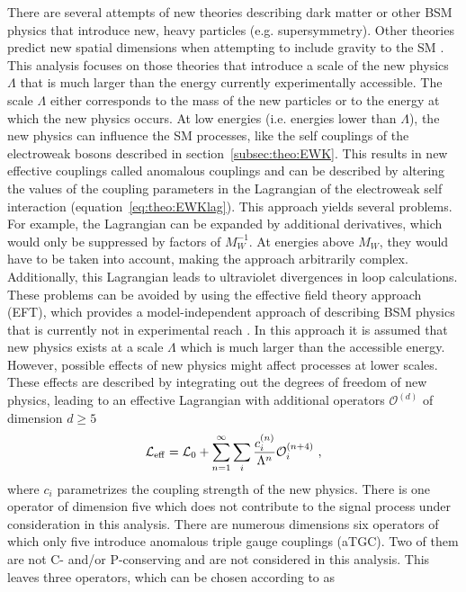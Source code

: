 \noindent There are several attempts of new theories describing dark matter or other BSM physics that introduce new, heavy particles (e.g. supersymmetry). Other theories predict new spatial dimensions when attempting to include gravity to the SM \cite{xdimensions}. This analysis focuses on those theories that introduce a scale of the new physics $\Lambda$ that is much larger than the energy currently experimentally accessible. The scale $\Lambda$ either corresponds to the mass of the new particles or to the energy at which the new physics occurs. At low energies (i.e. energies lower than $\Lambda$), the new physics can influence the SM processes, like the self couplings of the electroweak bosons described in section~\ref{subsec:theo:EWK}. This results in new effective couplings called anomalous couplings and can be described by altering the values of the coupling parameters in the Lagrangian of the electroweak self interaction (equation~\ref{eq:theo:EWKlag}). This approach yields several problems. For example, the Lagrangian can be expanded by additional derivatives, which would only be suppressed by factors of $M_W^{-1}$. At energies above $M_W$, they would have to be taken into account, making the approach arbitrarily complex. Additionally, this Lagrangian leads to ultraviolet divergences in loop calculations. These problems can be avoided by using the effective field theory approach (EFT), which provides a model-independent approach of describing BSM physics that is currently not in experimental reach \cite{EFT}. In this approach it is assumed that new physics exists at a scale $\Lambda$ which is much larger than the accessible energy. However, possible effects of new physics might affect processes at lower scales. These effects are described by integrating out the degrees of freedom of new physics, leading to an effective Lagrangian with additional operators $\mathcal{O}^{(d)}$ of dimension $d\geq 5$
\begin{equation}
\mathcal{L}_{\rm eff} = \mathcal{L}_0 + \sum_{n=1}^{\infty} \sum_i \frac{c_i^{(n)}}{\Lambda^{n}}\mathcal{O}_i^{(n+4)} ~, \label{eq:theo:operators}
\end{equation}
where $c_i$ parametrizes the coupling strength of the new physics. There is one operator of dimension five which does not contribute to the signal process under consideration in this analysis. There are numerous dimensions six operators of which only five introduce anomalous triple gauge couplings (aTGC). Two of them are not C- and/or P-conserving and are not considered in this analysis. This leaves three operators, which can be chosen according to \cite{EFTparam} as
